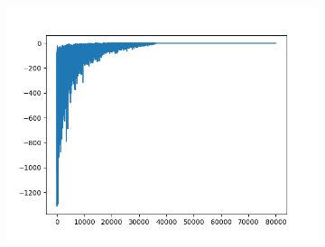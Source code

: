 \begin{figure}[H]
\begin{subfigure}{.25\textwidth}
	\end{subfigure}%
	\begin{subfigure}{.25\textwidth}
		\includegraphics[width=\textwidth]{img/train/matrice_7-11_27_26.png}
	\end{subfigure}%
	

\end{figure}
